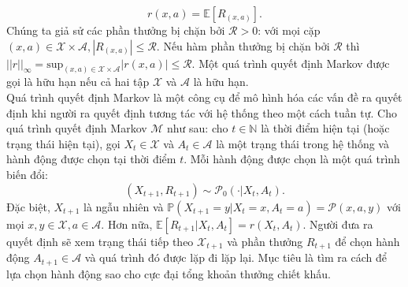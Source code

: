 \documentclass[14pt,a4paper,oneside]{report}		%
\begin{document}
$$r(x,a)=\mathbb{E}[R_{(x,a)}].$$
Chúng ta giả sử các phần thưởng bị chặn bởi $\mathcal{R} > 0$: với mọi cặp $(x,a) \in \mathcal{X}\times\mathcal{A}, |R_{(x,a)}|\leq\mathcal{R}$. Nếu hàm phần thưởng bị chặn bởi $\mathcal{R}$ thì $||r||_\infty = \text{sup}_{(x,a)\in\mathcal{X}\times\mathcal{A}}|r(x,a)|\leq\mathcal{R}$. Một quá trình quyết định Markov được gọi là hữu hạn nếu cả hai tập $\mathcal{X}$ và $\mathcal{A}$ là hữu hạn.\\
Quá trình quyết định Markov là một công cụ để mô hình hóa các vấn đề ra quyết định khi người ra quyết định tương tác với hệ thống theo một cách tuần tự. Cho quá trình quyết định Markov $\mathcal{M}$ như sau: cho $t\in\mathbb{N}$ là thời điểm hiện tại (hoặc trạng thái hiện tại), gọi $X_t\in\mathcal{X}$ và $A_t\in\mathcal{A}$ là một trạng thái trong hệ thống và hành động được chọn tại thời điểm $t$. Mỗi hành động được chọn là một quá trình biến đổi:
$$(X_{t+1},R_{t+1})\sim\mathcal{P}_0(\cdotp|X_t,A_t).$$
Đặc biệt, $X_{t+1}$ là ngẫu nhiên và $\mathbb{P}(X_{t+1}=y|X_t=x,A_t=a)=\mathcal{P}(x,a,y)$ với mọi $x,y\in\mathcal{X}, a\in\mathcal{A}$. Hơn nữa, $\mathbb{E}[R_{t+1}|X_t,A_t]=r(X_t,A_t)$. Người đưa ra quyết định sẽ xem trạng thái tiếp theo $\mathcal{X}_{t+1}$ và phần thưởng $R_{t+1}$ để chọn hành động $A_{t+1}\in\mathcal{A}$ và quá trình đó được lặp đi lặp lại. Mục tiêu là tìm ra cách để lựa chọn hành động sao cho cực đại tổng khoản thưởng chiết khấu.\\
\end{document}
